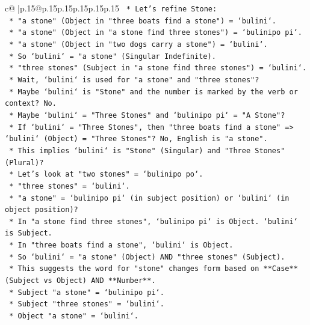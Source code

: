 \documentclass{article}
\begin{document}
{\begin{supertabular}{c@{$\;$}|p{.15\linewidth}@{}p{.15\linewidth}p{.15\linewidth}p{.15\linewidth}p{.15\linewidth}p{.15\linewidth}}
{{{\texttt{    *   Let's refine Stone:} \\
\texttt{        *   "a stone" (Object in "three boats find a stone") = `bulini`.} \\
\texttt{        *   "a stone" (Object in "a stone find three stones") = `bulinipo pi`.} \\
\texttt{        *   "a stone" (Object in "two dogs carry a stone") = `bulini`.} \\
\texttt{        *   So `bulini` = "a stone" (Singular Indefinite).} \\
\texttt{        *   "three stones" (Subject in "a stone find three stones") = `bulini`.} \\
\texttt{        *   Wait, `bulini` is used for "a stone" and "three stones"?} \\
\texttt{        *   Maybe `bulini` is "Stone" and the number is marked by the verb or context? No.} \\
\texttt{        *   Maybe `bulini` = "Three Stones" and `bulinipo pi` = "A Stone"?} \\
\texttt{            *   If `bulini` = "Three Stones", then "three boats find a stone" => `bulini` (Object) = "Three Stones"? No, English is "a stone".} \\
\texttt{            *   This implies `bulini` is "Stone" (Singular) and "Three Stones" (Plural)?} \\
\texttt{            *   Let's look at "two stones" = `bulinipo po`.} \\
\texttt{            *   "three stones" = `bulini`.} \\
\texttt{            *   "a stone" = `bulinipo pi` (in subject position) or `bulini` (in object position)?} \\
\texttt{            *   In "a stone find three stones", `bulinipo pi` is Object. `bulini` is Subject.} \\
\texttt{            *   In "three boats find a stone", `bulini` is Object.} \\
\texttt{            *   So `bulini` = "a stone" (Object) AND "three stones" (Subject).} \\
\texttt{            *   This suggests the word for "stone" changes form based on **Case** (Subject vs Object) AND **Number**.} \\
\texttt{            *   Subject "a stone" = `bulinipo pi`.} \\
\texttt{            *   Subject "three stones" = `bulini`.} \\
\texttt{            *   Object "a stone" = `bulini`.} \\
}}}
\end{supertabular}}
\end{document}
